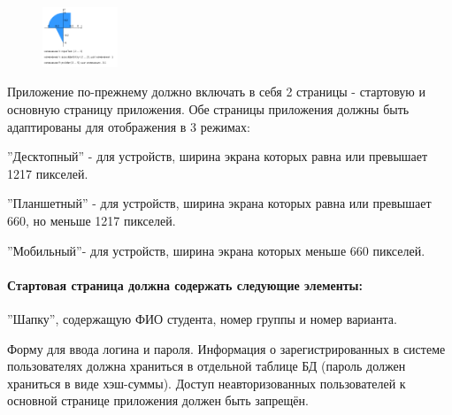 \documentclass[a4paper, 12pt]{article}
\newenvironment{itemize*}%
  {\begin{itemize}%
    \setlength{\itemsep}{1pt}%
    \setlength{\parskip}{1pt}}%
  {\end{itemize}}
\begin{document}
\begin{figure}
\begin{center}
\includegraphics[width=0.2\textwidth]{img/areas.png}
\end{center}
\end{figure}


Приложение по-прежнему должно включать в себя 2 страницы - стартовую и основную страницу приложения. Обе страницы приложения должны быть адаптированы для отображения в 3 режимах:
\begin{itemize*}
\item ''Десктопный'' - для устройств, ширина экрана которых равна или превышает 1217 пикселей.
\item ''Планшетный'' - для устройств, ширина экрана которых равна или превышает 660, но меньше 1217 пикселей.
\item ''Мобильный''- для устройств, ширина экрана которых меньше 660 пикселей.
\end{itemize*}

\paragraph{Стартовая страница должна содержать следующие элементы:}
\begin{itemize*}
\item ''Шапку'', содержащую ФИО студента, номер группы и номер варианта.
\item Форму для ввода логина и пароля. Информация о зарегистрированных в системе пользователях должна храниться в отдельной таблице БД (пароль должен храниться в виде хэш-суммы). Доступ неавторизованных пользователей к основной странице приложения должен быть запрещён.

\end{itemize*}
\end{document}
